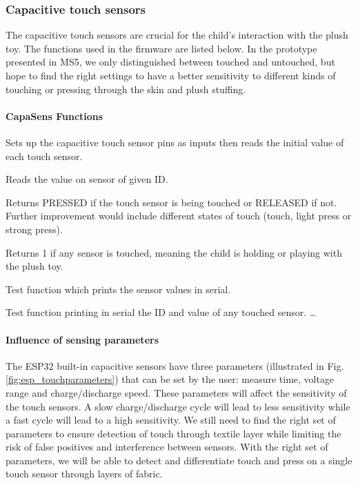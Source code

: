\begin{description}[align=left]
\item
\end{description}

\subsubsection{Capacitive touch sensors}\label{sec:capa_sens}

The capacitive touch sensors are crucial for the child's interaction with the plush toy. The functions used in the firmware are listed below. In the prototype presented in MS5, we only distinguished between touched and untouched, but hope to find the right settings to have a better sensitivity to different kinds of touching or pressing through the skin and plush stuffing. 

\paragraph{CapaSens Functions} 

\begin{description}[align=left]
\item[setup\_capa] Sets up the capacitive touch sensor pins as inputs then reads the initial value of each touch sensor.
\item[touch\_read\_value(touch\_id)] Reads the value on sensor of given ID. 
\item[capa\_touched(touch\_id)] Returns PRESSED if the touch sensor is being touched or RELEASED if not. Further improvement would include different states of touch (touch, light press or strong press).
\item[presence] Returns 1 if any sensor is touched, meaning the child is holding or playing with the plush toy.
\item[test\_touch\_values] Test function which prints the sensor values in serial.
\item[test\_if\_touched] Test function printing in serial the ID and value of any touched sensor.
 \ldots  
\end{description}
    
\paragraph{Influence of sensing parameters}
The ESP32 built-in capacitive sensors have three parameters (illustrated in Fig. \ref{fig:esp_touchparameters}) that can be set by the user: measure time, voltage range and charge/discharge speed. These parameters will affect the sensitivity of the touch sensors. A slow charge/discharge cycle will lead to less sensitivity while a fast cycle will lead to a high sensitivity. We still need to find the right set of parameters to ensure detection of touch through textile layer while limiting the risk of false positives and interference between sensors. With the right set of parameters, we will be able to detect and differentiate touch and press on a single touch sensor through layers of fabric. 

